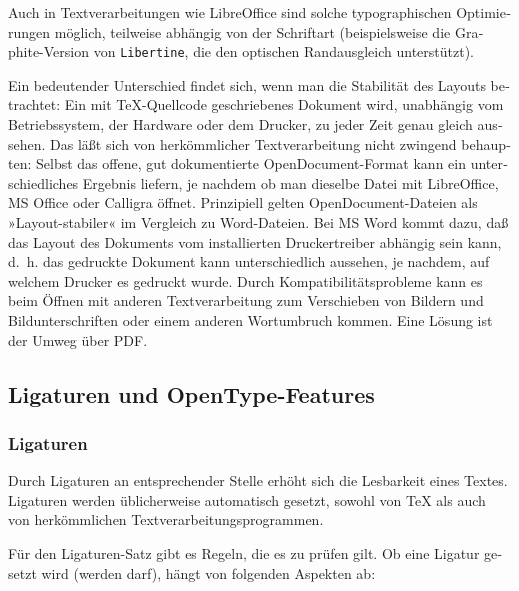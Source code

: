 \documentclass[11pt,a4paper,ngerman,french,DIV=8]{scrartcl}
\begin{document}
\begin{otherlanguage}{ngerman}
Auch in Textverarbeitungen wie LibreOffice sind solche typographischen Optimierungen möglich, teilweise abhängig von der Schriftart (beispielsweise die Graphite-Version von \texttt{Libertine}, die den optischen Randausgleich unterstützt).

Ein bedeutender Unterschied findet sich, wenn man die Stabilität des Layouts betrachtet: Ein mit \TeX{}-Quellcode geschriebenes Dokument wird, unabhängig vom Betriebssystem, der Hardware oder dem Drucker, zu jeder Zeit genau gleich aussehen. Das läßt sich von herkömmlicher Textverarbeitung nicht zwingend behaupten: Selbst das offene, gut dokumentierte OpenDocument-Format kann ein unterschiedliches Ergebnis liefern, je nachdem ob man dieselbe Datei mit LibreOffice, MS Office oder Calligra öffnet. Prinzipiell gelten OpenDocument-Dateien als »Layout-stabiler« im Vergleich zu Word-Dateien. Bei MS Word kommt dazu, daß das Layout des Dokuments vom installierten Druckertreiber abhängig sein kann, d.~h. das gedruckte Dokument kann unterschiedlich aussehen, je nachdem, auf welchem Drucker es gedruckt wurde. Durch Kompatibilitätsprobleme kann es beim Öffnen mit anderen Textverarbeitung zum Verschieben von Bildern und Bildunterschriften oder einem anderen Wortumbruch kommen. Eine Lösung ist der Umweg über PDF.

\subsection{Ligaturen und OpenType-Features}

\subsubsection{Ligaturen}

Durch Ligaturen an entsprechender Stelle erhöht sich die Lesbarkeit eines Textes. Ligaturen werden üblicherweise automatisch gesetzt, sowohl von \TeX{} als auch von herkömmlichen Textverarbeitungsprogrammen.

Für den Ligaturen-Satz gibt es Regeln, die es zu prüfen gilt. Ob eine Ligatur gesetzt wird (werden darf), hängt von folgenden Aspekten ab:


\end{otherlanguage}
\end{document}
